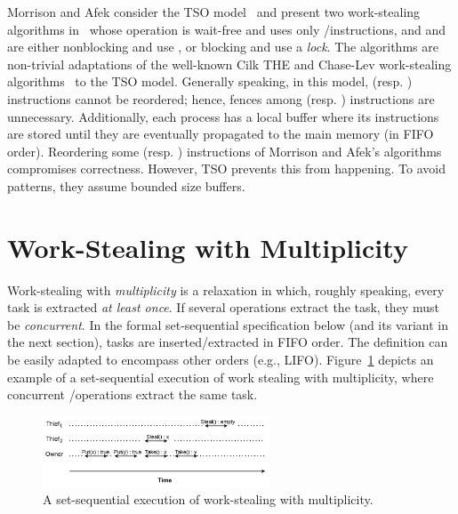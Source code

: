 Morrison and Afek consider the TSO model~\cite{DBLP_journals_cacm_SewellSONM10} and present two work-stealing algorithms in~\cite{fencefreework} whose \Put operation is wait-free and uses only \R/\W instructions,  and \Take and \Steal are either nonblocking and use \CAS, or blocking and use a \emph{lock}. The algorithms are non-trivial adaptations of the well-known Cilk THE and Chase-Lev work-stealing algorithms~\cite{circular.work.stealing, FLR98} to the TSO model. Generally speaking, in this model, \W (resp. \R) instructions cannot be reordered; hence, fences among \W (resp. \R) instructions are unnecessary. Additionally, each process has a local buffer where its \W instructions are stored until they are eventually propagated to the main memory (in FIFO order). Reordering some \W (resp. \R) instructions of Morrison and Afek's algorithms compromises correctness. However, TSO prevents this from happening. To avoid \RAW patterns, they assume bounded size \W buffers.

\section{\label{sec-ws-mult}Work-Stealing with Multiplicity}

Work-stealing with \emph{multiplicity} is a relaxation in which, roughly speaking, every task is extracted \emph{at least once}. If several operations extract the task, they must be \emph{concurrent}. In the formal set-sequential specification below (and its variant in the next section), tasks are inserted/extracted in FIFO order. The definition can be easily adapted to encompass other orders (e.g., LIFO). Figure~\ref{fig-example-execution} depicts an example of a set-sequential execution of work stealing with multiplicity, where concurrent \Take/\Steal operations extract the same task.

\begin{figure}[ht]
  \begin{center}
    \includegraphics[width=0.6\textwidth]{contents/figures/IV_1_set-linearizability.pdf}
    \caption{\label{fig-example-execution}A set-sequential execution
      of work-stealing with multiplicity.}
  \end{center}
\end{figure}

